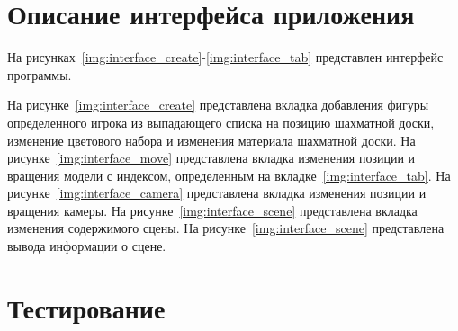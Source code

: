 %

\section{Описание интерфейса приложения}
На рисунках~\ref{img:interface_create}-\ref{img:interface_tab} представлен интерфейс программы. 

На рисунке~\ref{img:interface_create} представлена вкладка добавления фигуры определенного игрока из выпадающего списка на позицию шахматной доски, изменение цветового набора и изменения материала шахматной доски. На рисунке~\ref{img:interface_move} представлена вкладка изменения позиции и вращения модели с индексом, определенным на вкладке~\ref{img:interface_tab}. На рисунке~\ref{img:interface_camera} представлена вкладка изменения позиции и вращения камеры. На рисунке~\ref{img:interface_scene} представлена вкладка изменения содержимого сцены. На рисунке~\ref{img:interface_scene} представлена вывода информации о сцене.

\FloatBarrier
{}
\FloatBarrier
{}
\FloatBarrier
{}
\FloatBarrier
{}
\FloatBarrier
{}
\FloatBarrier

\clearpage
\section{Тестирование}

